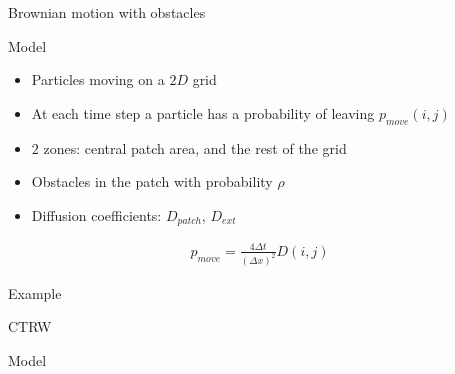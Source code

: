 \documentclass{beamer}
\begin{document}
\begin{frame}{Brownian motion with obstacles}
\begin{block}{Model}
\begin{itemize}
\itemsep1em
\item Particles moving on a $2D$ grid
\item At each time step a particle has a probability of leaving $p_{move}(i,j)$
\item $2$ zones: central patch area, and the rest of the grid
\item Obstacles in the patch with probability $\rho$
\item Diffusion coefficients: $D_{patch}$, $D_{ext}$
\end{itemize}
\end{block}

\begin{align*}
p_{move} = \frac{4 \Delta t}{(\Delta x)^2} D(i,j)
\end{align*}


\end{frame}

\begin{frame}
\begin{center}
\Huge \color{blue} Example
\end{center}
\end{frame}

\begin{frame}{CTRW}
\begin{block}{Model}

\end{block}
\end{frame}

\begin{frame}
\end{frame}

\begin{frame}
\end{frame}

\begin{frame}
\end{frame}
\end{document}

